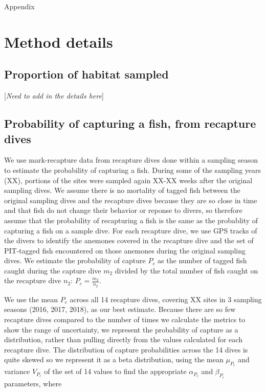 \documentclass[12pt, oneside]{article}   	%
\begin{document}
\newpage{}

{\LARGE Appendix}

\appendix

\renewcommand{\theequation}{A\arabic{equation}}
\renewcommand{\thetable}{A\arabic{table}}
\setcounter{equation}{0}  %
\setcounter{figure}{0}
\setcounter{table}{0}

\section{Method details}
\subsection{Proportion of habitat sampled} \label{APP_SEC_ProbHabSampled}
[\textit{Need to add in the details here}]

\newpage{}

\subsection{Probability of capturing a fish, from recapture dives} \label{APP_SEC_ProbR}

We use mark-recapture data from recapture dives done within a sampling season to estimate the probability of capturing a fish. During some of the sampling years (XX), portions of the sites were sampled again XX-XX weeks after the original sampling dives. We assume there is no mortality of tagged fish between the original sampling dives and the recapture dives because they are so close in time and that fish do not change their behavior or reponse to divers, so therefore assume that the probability of recapturing a fish is the same as the probablity of capturing a fish on a sample dive. For each recapture dive, we use GPS tracks of the divers to identify the anemones covered in the recapture dive and the set of PIT-tagged fish encountered on those anemones during the original sampling dives. We estimate the probability of capture $P_c$ as the number of tagged fish caught during the capture dive $m_2$ divided by the total number of fish caught on the recapture dive $n_2$: $P_c = \frac{m_2}{n_2}$. 

We use the mean $P_c$ across all 14 recapture dives, covering XX sites in 3 sampling seasons (2016, 2017, 2018), as our best estimate. Because there are so few recapture dives compared to the number of times we calculate the metrics to show the range of uncertainty, we represent the probability of capture as a distribution, rather than pulling directly from the values calculated for each recapture dive. The distribution of capture probabilities across the 14 dives is quite skewed so we represent it as a beta distribution, using the mean $\mu_{P_c}$ and variance $V_{P_c}$ of the set of 14 values to find the appropriate $\alpha_{P_c}$ and $\beta_{P_c}$ parameters, where 
\end{document}
